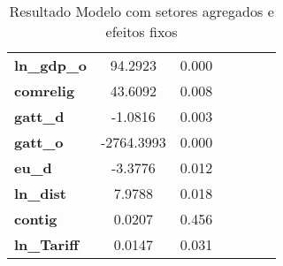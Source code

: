 \begin{table}[ht]
\begin{center}
\begin{tabular}{lcccccc}
    \textbf{ln\_gdp\_o}                                                &      94.2923 &        0.000       \\
    \textbf{comrelig}                                                  &      43.6092 &        0.008       \\
    \textbf{gatt\_d}                                                   &      -1.0816 &        0.003       \\
    \textbf{gatt\_o}                                                   &   -2764.3993 &        0.000       \\
    \textbf{eu\_d}                                                     &      -3.3776 &        0.012       \\
    \textbf{ln\_dist}                                                  &       7.9788 &        0.018       \\
    \textbf{contig}                                                    &       0.0207 &        0.456       \\
    \textbf{ln\_Tariff}                                                &       0.0147 &        0.031       \\
    \bottomrule
    \end{tabular}
    \end{center}
    \caption{Resultado Modelo com setores agregados e efeitos fixos}
    \end{table}